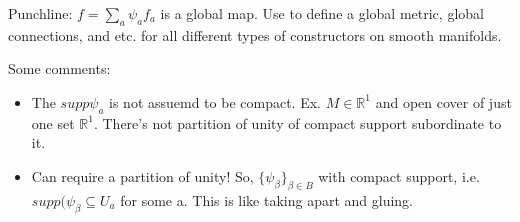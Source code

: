 \documentclass[12pt,letterpaper]{article}
\begin{document}
Punchline: $f = \sum_a \psi_a f_a$ is a global map. Use to define a global metric, global connections, and etc. for all different types of constructors on smooth manifolds. 

Some comments: 
\begin{itemize}
    \item The $supp\psi_a$ is not assuemd to be compact. Ex. $M \in \mathbb{R}^1$ and open cover of just one set $\mathbb{R}^1$. There's not partition of unity of compact support subordinate to it. 
    \item Can require a partition of unity! So, $\{\psi_{\beta}\}_{\beta\in B}$ with compact support, i.e. $supp(\psi_{\beta} \subseteq U_a$ for some a. This is like taking apart and gluing. 
\end{itemize}
\end{document}
